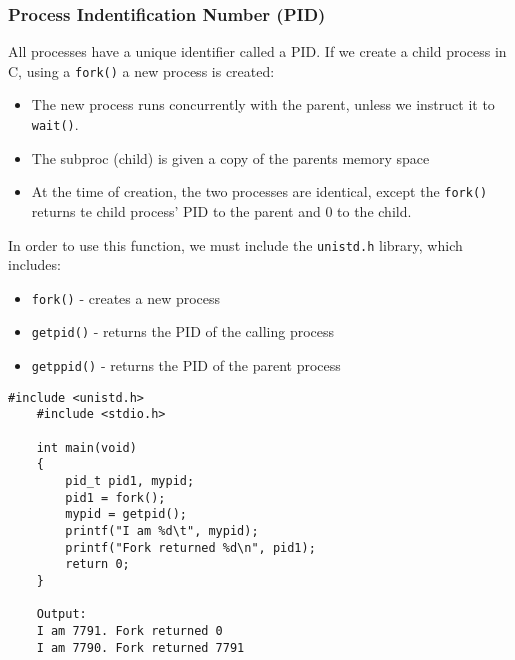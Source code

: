 \documentclass[a4paper, 10pt]{article}
\begin{document}
\subsubsection*{Process Indentification Number (PID)}
All processes have a unique identifier called a PID. If we create a child process in C, using a \texttt{fork()} a new process is created:
\begin{itemize}
    \item The new process runs concurrently with the parent, unless we instruct it to \texttt{wait()}.
    \item The subproc (child) is given a copy of the parents memory space
    \item At the time of creation, the two processes are identical, except the \texttt{fork()} returns te child process' PID to the parent and 0 to the child.
\end{itemize}
In order to use this function, we must include the \texttt{unistd.h} library, which includes:
\begin{itemize}
    \item \texttt{fork()} - creates a new process
    \item \texttt{getpid()} - returns the PID of the calling process
    \item \texttt{getppid()} - returns the PID of the parent process
\end{itemize}
\begin{lstlisting}[style=cStyle, caption={Forking a process}]
    #include <unistd.h>
    #include <stdio.h>

    int main(void)
    {
        pid_t pid1, mypid;
        pid1 = fork();
        mypid = getpid();
        printf("I am %d\t", mypid);
        printf("Fork returned %d\n", pid1);
        return 0;
    }

    Output:
    I am 7791. Fork returned 0
    I am 7790. Fork returned 7791
\end{lstlisting}
\end{document}
